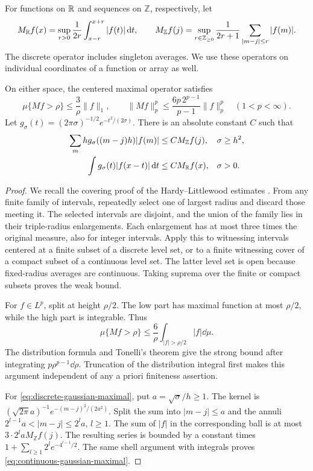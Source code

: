 For functions on $\mathbb R$ and sequences on $\mathbb Z$, respectively, let
\[
 M_{\mathbb R}f(x)=\sup_{r>0}\frac1{2r}\int_{x-r}^{x+r}|f(t)|\,\mathrm d t,
 \qquad
 M_{\mathbb Z}f(j)=\sup_{r\in\mathbb Z_{\ge0}}
       \frac1{2r+1}\sum_{|m-j|\le r}|f(m)|.
\]
The discrete operator includes singleton averages. We use these
operators on individual coordinates of a function or array as well.

\begin{lemma}\label{lem:line-maximal}
On either space, the centered maximal operator satisfies
\[
 \mu\{Mf>\rho\}\le\frac3\rho\|f\|_1,
 \qquad
 \|Mf\|_p^p\le\frac{6p\,2^{p-1}}{p-1}\|f\|_p^p
 \quad(1<p<\infty).
\]
Let $g_\sigma(t)=(2\pi\sigma)^{-1/2}e^{-t^2/(2\sigma)}$.
There is an absolute constant $C$ such that
\begin{align}
 \sum_m h g_\sigma((m-j)h)|f(m)|
   &\le C M_{\mathbb Z}f(j), &&\sigma\ge h^2,
   \label{eq:discrete-gaussian-maximal}\\
 \int g_\sigma(t)|f(x-t)|\,\mathrm d t
   &\le C M_{\mathbb R}f(x), &&\sigma>0.
   \label{eq:continuous-gaussian-maximal}
\end{align}
\end{lemma}
\begin{proof}
We recall the covering proof of the Hardy--Littlewood estimates
\cite{HardyLittlewood1930}. From any finite family of intervals, repeatedly
select one of largest radius and discard those meeting it. The selected
intervals are disjoint, and the union of the family lies in their
triple-radius enlargements. Each enlargement has at most three times
the original measure, also for integer intervals. Apply this to witnessing
intervals centered at a finite subset of a discrete level set, or to a
finite witnessing cover of a compact subset of a continuous level set.
The latter level set is open because fixed-radius averages are continuous.
Taking suprema over the finite or compact subsets proves the weak bound.

For $f\in L^p$, split at height $\rho/2$. The low part has maximal
function at most $\rho/2$, while the high part is integrable. Thus
\[
 \mu\{Mf>\rho\}
 \le\frac6\rho\int_{|f|>\rho/2}|f|\dd\mu.
\]
The distribution formula and Tonelli's theorem give the strong bound
after integrating $p\rho^{p-1}\dd\rho$. Truncation of the distribution
integral first makes this argument independent of any a priori
finiteness assertion.

For \eqref{eq:discrete-gaussian-maximal}, put $a=\sqrt\sigma/h\ge1$.
The kernel is $(\sqrt{2\pi}a)^{-1}e^{-(m-j)^2/(2a^2)}$.
Split the sum into $|m-j|\le a$ and the annuli
$2^{l-1}a<|m-j|\le2^la$, $l\ge1$. The sum of $|f|$ in the
corresponding ball is at most $3\cdot2^la M_{\mathbb Z}f(j)$.
The resulting series is bounded by a constant times
$1+\sum_{l\ge1}2^l e^{-4^{l-1}/2}$.
The same shell argument with integrals proves
\eqref{eq:continuous-gaussian-maximal}.
\end{proof}
